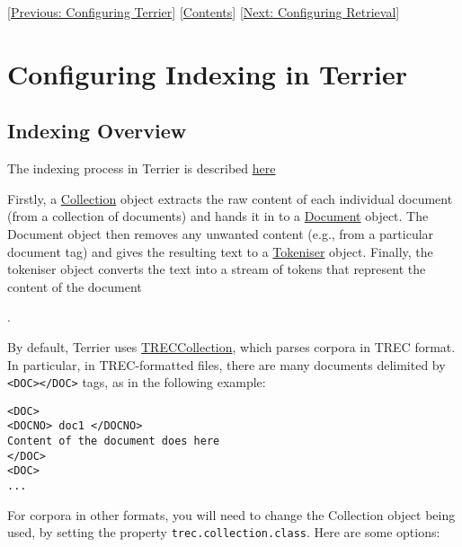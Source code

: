 {[}\href{configure_general.html}{Previous: Configuring Terrier}{]}
{[}\href{index.html}{Contents}{]}
{[}\href{configure_retrieval.html}{Next: Configuring Retrieval}{]}

\section{Configuring Indexing in
Terrier}\label{configuring-indexing-in-terrier}

\subsection{Indexing Overview}\label{indexing-overview}

The indexing process in Terrier is described
\href{http://terrier.org/docs/current/basicComponents.html}{here}

Firstly, a
\href{javadoc/org/terrier/indexing/TRECCollection.html}{Collection}
object extracts the raw content of each individual document (from a
collection of documents) and hands it in to a
\href{javadoc/org/terrier/indexing/Document.html}{Document} object. The
Document object then removes any unwanted content (e.g., from a
particular document tag) and gives the resulting text to a
\href{javadoc/org/terrier/indexing/tokenisation/Tokeniser.html}{Tokeniser}
object. Finally, the tokeniser object converts the text into a stream of
tokens that represent the content of the document

.

By default, Terrier uses
\href{javadoc/org/terrier/indexing/TRECCollection.html}{TRECCollection},
which parses corpora in TREC format. In particular, in TREC-formatted
files, there are many documents delimited by
\texttt{\textless{}DOC\textgreater{}\textless{}/DOC\textgreater{}} tags,
as in the following example:

\begin{verbatim}
<DOC>
<DOCNO> doc1 </DOCNO>
Content of the document does here
</DOC>
<DOC>
...
\end{verbatim}

For corpora in other formats, you will need to change the Collection
object being used, by setting the property
\texttt{trec.collection.class}. Here are some options:

